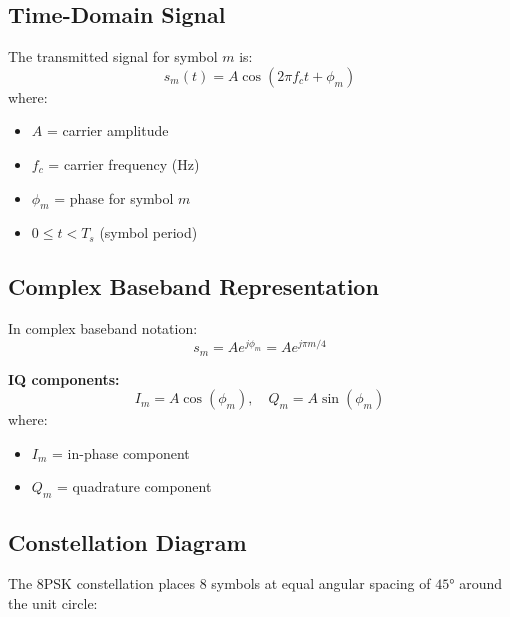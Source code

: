 \subsection{Time-Domain Signal}

The transmitted signal for symbol $m$ is:
\begin{equation}
s_m(t) = A\cos(2\pi f_c t + \phi_m)
\end{equation}
where:
\begin{itemize}
\item $A$ = carrier amplitude
\item $f_c$ = carrier frequency (Hz)
\item $\phi_m$ = phase for symbol $m$
\item $0 \leq t < T_s$ (symbol period)
\end{itemize}

\subsection{Complex Baseband Representation}

In complex baseband notation:
\begin{equation}
s_m = A e^{j\phi_m} = A e^{j\pi m/4}
\end{equation}

\textbf{IQ components:}
\begin{equation}
I_m = A\cos(\phi_m), \quad Q_m = A\sin(\phi_m)
\end{equation}
where:
\begin{itemize}
\item $I_m$ = in-phase component
\item $Q_m$ = quadrature component
\end{itemize}

\subsection{Constellation Diagram}

The 8PSK constellation places 8 symbols at equal angular spacing of $45°$ around the unit circle:

